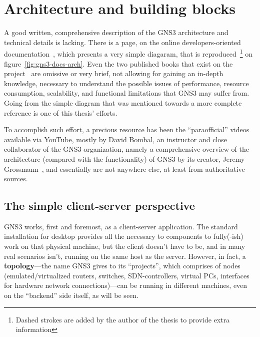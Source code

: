 \section{Architecture and building blocks}
\label{sec:gns3architecture}

A good written, comprehensive description of the GNS3 architecture and technical details is lacking.
There is a page, on the online developers-oriented documentation~\cite{gns3devarch}, which presents a very simple diagaram, that is reproduced~\footnote{Dashed strokes are added by the author of the thesis to provide extra information} on figure~\ref{fig:gns3-docs-arch}.
Even the two published books that exist on the project~\cite{gns3netsimguide,thebookofgns3} are omissive or very brief, not allowing for gaining an in-depth knowledge, necessary to understand the possible issues of performance, resource consumption, scalability, and functional limitations that GNS3 may suffer from.
Going from the simple diagram that was mentioned towards a more complete reference is one of this thesis' efforts.

To accomplish such effort, a precious resource has been the ``paraofficial'' videos available via YouTube, mostly by David Bombal, an instructor and close collaborator of the GNS3 organization, namely a comprehensive overview of the architecture (compared with the functionality) of GNS3 by its creator, Jeremy Grossmann~\cite{ytgns3arch22}, and essentially are not anywhere else, at least from authoritative sources. %



\subsection{The simple client-server perspective}
\label{subsec:gns3clientserver}

GNS3 works, first and foremost, as a client-server application.
The standard installation for desktop provides all the necessary to components to fully(-ish) work on that physical machine, but the client doesn't have to be, and in many real scenarios isn't, running on the same host as the server.
However, in fact, a \textbf{topology}---the name GNS3 gives to its ``projects'', which comprises of nodes (emulated/virtualized routers, switches, SDN-controllers, virtual PCs, interfaces for hardware network connections)---can be running in different machines, even on the ``backend'' side itself, as will be seen.

